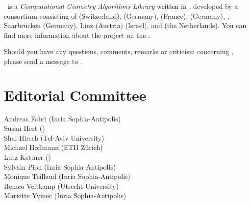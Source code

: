 
\cgal\ is a {\em Computational Geometry Algorithms Library} written in \CC, 
developed by a consortium consisting of
 (Switzerland), 
 (Germany), 
 (France),
 (Germany),
,
Saarbr\"ucken (Germany),
 Linz (Austria)
 (Israel), and
 (the Netherlands). 
You can find more information about the project on the
.


Should you have any questions, comments, remarks or criticism concerning 
\cgal, please send a message to 
.

\section*{Editorial Committee}

Andreas Fabri ({\sc Inria} Sophia-Antipolis) \\
Susan Hert ()\\
Shai Hirsch (Tel-Aviv University) \\
Michael Hoffmann (ETH Z\"urich) \\
Lutz Kettner ()\\
Sylvain Pion ({\sc Inria} Sophia-Antipolis)\\
Monique Teillaud ({\sc Inria} Sophia-Antipolis)\\
Remco Veltkamp (Utrecht University)\\
Mariette Yvinec ({\sc Inria} Sophia-Antipolis)\\



